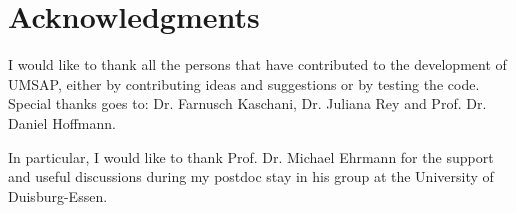\newpage

\section{Acknowledgments}

I would like to thank all the persons that have contributed to the development of UMSAP, either by contributing ideas and suggestions or by testing the code. Special thanks goes to: Dr. Farnusch Kaschani, Dr. Juliana Rey and Prof. Dr. Daniel Hoffmann.

In particular, I would like to thank Prof. Dr. Michael Ehrmann for the support and useful discussions during my postdoc stay in his group at the University of Duisburg-Essen. 

